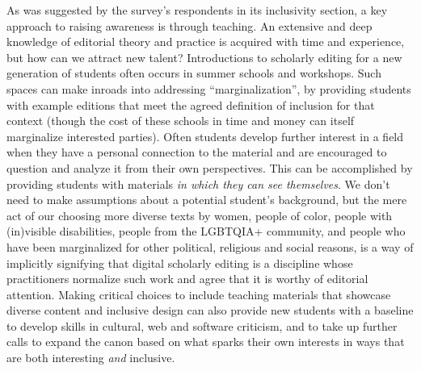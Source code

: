 \begin{paper}
As was suggested by the survey's respondents in its inclusivity section,
a key approach to raising awareness is through teaching. An extensive
and deep knowledge of editorial theory and practice is acquired with
time and experience, but how can we attract new talent? Introductions to
scholarly editing for a new generation of students often occurs in
summer schools and workshops. Such spaces can make inroads into
addressing ``marginalization'', by providing students with example
editions that meet the agreed definition of inclusion for that context
(though the cost of these schools in time and money can itself
marginalize interested parties). Often students develop further interest
in a field when they have a personal connection to the material and are
encouraged to question and analyze it from their own perspectives. This
can be accomplished by providing students with materials \emph{in which
they can see themselves}. We don't need to make assumptions about a
potential student's background, but the mere act of our choosing more
diverse texts by women, people of color, people with (in)visible
disabilities, people from the LGBTQIA+ community, and people who have
been marginalized for other political, religious and social reasons, is
a way of implicitly signifying that digital scholarly editing is a
discipline whose practitioners normalize such work and agree that it is
worthy of editorial attention. Making critical choices to include
teaching materials that showcase diverse content and inclusive design
can also provide new students with a baseline to develop skills in
cultural, web and software criticism, and to take up further calls to
expand the canon based on what sparks their own interests in ways that
are both interesting \emph{and} inclusive.


\end{paper}
